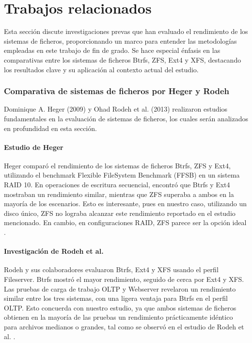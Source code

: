 \chapter{Trabajos relacionados}\label{sec:trabajos relacionados}

Esta sección discute investigaciones prevas que han evaluado el rendimiento de los sistemas de ficheros, proporcionando un marco para entender las metodologías empleadas en este trabajo de fin de grado. Se hace especial énfasis en las comparativas entre los sistemas de ficheros Btrfs, ZFS, Ext4 y XFS, destacando los resultados clave y su aplicación al contexto actual del estudio.

\subsection{Comparativa de sistemas de ficheros por Heger y Rodeh}

Dominique A. Heger (2009) y Ohad Rodeh et al. (2013) realizaron estudios fundamentales en la evaluación de sistemas de ficheros, los cuales serán analizados en profundidad en esta sección.

\subsubsection{Estudio de Heger}

Heger comparó el rendimiento de los sistemas de ficheros Btrfs, ZFS y Ext4, utilizando el benchmark Flexible FileSystem Benchmark (FFSB) en un sistema RAID 10. En operaciones de escritura secuencial, encontró que Btrfs y Ext4 mostraban un rendimiento similar, mientras que ZFS superaba a ambos en la mayoría de los escenarios. Esto es interesante, pues en nuestro caso, utilizando un disco único, ZFS no lograba alcanzar este rendimiento reportado en el estudio mencionado. En cambio, en configuraciones RAID, ZFS parece ser la opción ideal \cite{heger2012fs}.

\subsubsection{Investigación de Rodeh et al.}

Rodeh y sus colaboradores evaluaron Btrfs, Ext4 y XFS usando el perfil Fileserver. Btrfs mostró el mayor rendimiento, seguido de cerca por Ext4 y XFS. Las pruebas de carga de trabajo OLTP y Webserver revelaron un rendimiento similar entre los tres sistemas, con una ligera ventaja para Btrfs en el perfil OLTP. Esto concuerda con nuestro estudio, ya que ambos sistemas de ficheros obtienen en la mayoría de las pruebas un rendimiento prácticamente idéntico para archivos medianos o grandes, tal como se observó en el estudio de Rodeh et al. \cite{rodeh2013btrfs}.

